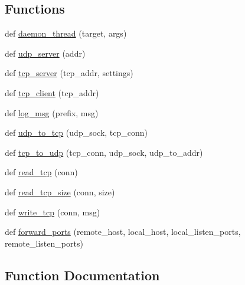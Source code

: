 \subsection*{Functions}
\begin{DoxyCompactItemize}
\item 
def \mbox{\hyperlink{namespacepysc2_1_1env_1_1lan__sc2__env_a3270fe764af5013a8b59a23bd0b71269}{daemon\+\_\+thread}} (target, args)
\item 
def \mbox{\hyperlink{namespacepysc2_1_1env_1_1lan__sc2__env_a204dc3d18091f4b60f807a981af37f93}{udp\+\_\+server}} (addr)
\item 
def \mbox{\hyperlink{namespacepysc2_1_1env_1_1lan__sc2__env_afbc0f05c4223cd53205fab03764798d4}{tcp\+\_\+server}} (tcp\+\_\+addr, settings)
\item 
def \mbox{\hyperlink{namespacepysc2_1_1env_1_1lan__sc2__env_a9bec6c3280a64bbca62248322a780da1}{tcp\+\_\+client}} (tcp\+\_\+addr)
\item 
def \mbox{\hyperlink{namespacepysc2_1_1env_1_1lan__sc2__env_ac87a5369e364472d49c7d9cf29d61712}{log\+\_\+msg}} (prefix, msg)
\item 
def \mbox{\hyperlink{namespacepysc2_1_1env_1_1lan__sc2__env_aeaaac75d1c4f888f2420f17fe66c91e2}{udp\+\_\+to\+\_\+tcp}} (udp\+\_\+sock, tcp\+\_\+conn)
\item 
def \mbox{\hyperlink{namespacepysc2_1_1env_1_1lan__sc2__env_a61cc2ab183c1d44e6608cf31714b6ce5}{tcp\+\_\+to\+\_\+udp}} (tcp\+\_\+conn, udp\+\_\+sock, udp\+\_\+to\+\_\+addr)
\item 
def \mbox{\hyperlink{namespacepysc2_1_1env_1_1lan__sc2__env_aee36eac17320044abe68836c1cac2e62}{read\+\_\+tcp}} (conn)
\item 
def \mbox{\hyperlink{namespacepysc2_1_1env_1_1lan__sc2__env_adaab988a6e1afb1f3068ffee790bc421}{read\+\_\+tcp\+\_\+size}} (conn, size)
\item 
def \mbox{\hyperlink{namespacepysc2_1_1env_1_1lan__sc2__env_a3a528c599229d1ff814b2da870b0761e}{write\+\_\+tcp}} (conn, msg)
\item 
def \mbox{\hyperlink{namespacepysc2_1_1env_1_1lan__sc2__env_a8382bec2e77ada186d50420c6b6e2c49}{forward\+\_\+ports}} (remote\+\_\+host, local\+\_\+host, local\+\_\+listen\+\_\+ports, remote\+\_\+listen\+\_\+ports)
\end{DoxyCompactItemize}


\subsection{Function Documentation}
\mbox{\label{namespacepysc2_1_1env_1_1lan__sc2__env_a3270fe764af5013a8b59a23bd0b71269}} 
